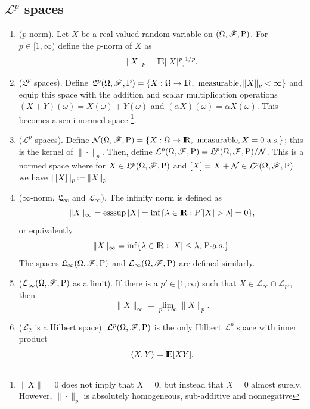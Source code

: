 \documentclass[a4paper,10pt]{article}
\begin{document}
\subsection{$\mathcal{L}^p$ spaces}
\begin{enumerate}
 \item ($p$-norm). Let $X$ be a real-valued random variable on $(\Omega,\mathscr{F},\mathrm{P})$. For $p\in[1,\infty)$ define the $p$-norm of $X$ as 
       \[
        \|X\|_p = \E[|X|^p]^{1/p}.
       \]
 \item ($\mathfrak{L}^p$ spaces). Define $\mathfrak{L}^p\ofp=\{X:\Omega\to\Re,\text{ measurable}, 
       \|X\|_p<\infty\}$ and equip this space with the addition and scalar multiplication 
       operations $(X+Y)(\omega) = X(\omega) + Y(\omega)$ and $(\alpha X)(\omega) = \alpha X(\omega)$.
       This becomes a semi-normed space%
	  \footnote{$\|X\|=0$ does not imply that $X=0$, but instead 
		    that $X=0$ almost surely. However, $\|\cdot\|_p$ is absolutely 
		    homogeneous, sub-additive and nonnegative}.%
 \item ($\mathcal{L}^p$ spaces). Define $\mathcal{N}\ofp = \{X:\Omega\to\Re,
       \text{ measurable}, X=0 \text{ a.s.}\}$; this is the kernel of $\|\cdot\|_p$. 
       Then, define $\mathcal{L}^p(\Omega,\mathscr{F},\mathrm{P}) = \mathfrak{L}^p(\Omega,\mathscr{F},\mathrm{P}) / \mathcal{N}$.
       This is a normed space where for $X\in\mathfrak{L}^p(\Omega,\mathscr{F},\mathrm{P})$ and $[X]=X+\mathcal{N}\in\mathcal{L}^p(\Omega,\mathscr{F},\mathrm{P})$
       we have $\|[X]\|_p {}\mathop{\mathrel{:}=}{} \|X\|_p$.
 \item ($\infty$-norm, $\mathfrak{L}_\infty$ and $\mathcal{L}_\infty$). The infinity norm is defined as 
	\[
	 \|X\|_\infty = \esssup |X| = \inf\{\lambda \in \Re: \prob[|X|> \lambda] = 0\},
	\]
	or equivalently 
	\[
	 \|X\|_\infty = \inf \{\lambda \in \Re: |X|\leq \lambda,\, \prob\text{-a.s.}\}.
	\]
	The spaces $\mathfrak{L}_\infty(\Omega,\mathscr{F},\mathrm{P})$ and $\mathcal{L}_\infty(\Omega,\mathscr{F},\mathrm{P})$ are defined 
	similarly.
 \item ($\mathcal{L}_\infty(\Omega,\mathscr{F},\mathrm{P})$ as a limit). If there is a $p'\in [1,\infty)$ such 
       that $X\in\mathcal{L}_\infty\cap \mathcal{L}_{p'}$, then
       \[
        \|X\|_\infty = \lim_{p\to\infty}\|X\|_p.
       \]

 \item ($\mathcal{L}_2$ is a Hilbert space). $\mathcal{L}^p(\Omega,\mathscr{F},\mathrm{P})$ is the only Hilbert 
       $\mathcal{L}^p$ space with inner product
       \[
        \<X,Y\> = \E[XY].
       \]


\end{enumerate}
\end{document}
